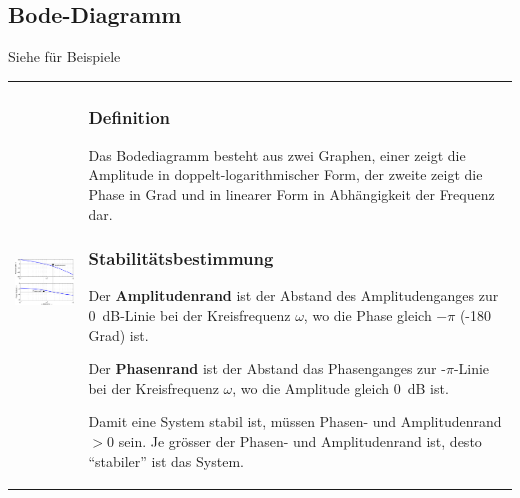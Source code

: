 \subsection{Bode-Diagramm }
Siehe  für Beispiele\\
\begin{tabular}{ll}
	\parbox{7cm}{
		\includegraphics[width=7cm]{./images/bode-stabilitaet.png}
	}
	& \parbox{11cm}{
		\subsubsection{Definition}
		Das Bodediagramm besteht aus zwei Graphen, einer zeigt die Amplitude in
		doppelt-logarithmischer Form, der zweite zeigt die Phase in Grad und in
		linearer Form in Abhängigkeit der Frequenz dar.
		
		\subsubsection{Stabilitätsbestimmung  }
		Der {\bf Amplitudenrand} ist der Abstand des
		Amplitudenganges zur 0~dB-Linie bei der Kreisfrequenz $\omega$, wo die Phase
		gleich $-\pi$ (-180 Grad) ist. \\
		
		Der {\bf Phasenrand} ist der Abstand das Phasenganges zur
		-$\pi$-Linie bei der Kreisfrequenz $\omega$, wo die Amplitude gleich 0~dB
		ist. \\
		
		Damit eine System stabil ist, m\"ussen Phasen- und Amplitudenrand
		$>0$ sein. Je gr\"osser der Phasen- und Amplitudenrand ist, desto
		``stabiler'' ist das System.
	}
\end{tabular}

\newpage 

\renewcommand{\arraystretch}{1}

